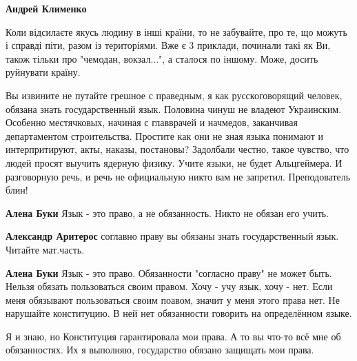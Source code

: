 \begin{itemize}
\begin{itemize}

\textbf{Андрей Клименко}

Коли відсилаєте якусь людину в інші країни, то не забувайте, про те, що можуть
і справді піти, разом із територіями. Вже є 3 приклади, починали такі як Ви,
також тільки про "чемодан, вокзал...", а сталося по іншому. \Laughey[1.0][white]
Може, досить руйнувати країну.
\end{itemize}



Вы извините не путайте грешное с праведным, я как русскоговорящий человек,
обязана знать государственный язык. Половина чинуш не владеют Украинским.
Особенно местячковых, начиная с главврачей и начмедов, заканчивая департаментом
строительства. Простите как они не зная языка понимают и интерпритируют, акты,
наказы, постановы? Задолбали честно, такое чувство, что людей просят выучить
ядерную физику. Учите языки, не будет Альцгеймера. И разговорную речь, и речь
не официальную никто вам не запретил. Преподователь блин!

\begin{itemize}

\textbf{Алена Буки} Язык - это право, а не обязанность.
Никто не обязан его учить.


\textbf{Александр Аритерос} соглавно праву вы обязаны знать государственный язык. Читайте мат.часть.


\textbf{Алена Буки} Язык - это право. Обязанности "согласно праву" не может быть. Нельзя обязать пользоваться своим правом.
Хочу - учу язык, хочу - нет.
Если меня обязывают пользоваться своим поавом, значит у меня этого права нет.
Не нарушайте конституцию. В ней нет обязанности говорить на определённом языке.


Я и знаю, но Конституция гарантировала мои права. А то вы что-то всё мне об
обязанностях. Их я выполняю, государство обязано защищать мои права.



\end{itemize}
\end{itemize}
